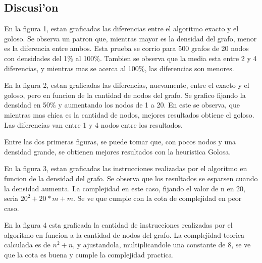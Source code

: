 \subsection{Discusi'on}

En la figura 1, estan graficadas las diferencias entre el algoritmo exacto y el goloso. Se observa un patron que, mientras mayor es la densidad del grafo, menor es la diferencia entre ambos. Esta prueba se corrio para 500 grafos de 20 nodos con densidades del 1\% al 100\%. Tambien se observa que la media esta entre 2 y 4 diferencias, y mientras mas se acerca al 100\%, las diferencias son menores.


En la figura 2, estan graficadas las diferencias, nuevamente, entre el exacto y el goloso, pero en funcion de la cantidad de nodos del grafo. Se grafico fijando la densidad en 50\% y aumentando los nodos de 1 a 20. En este se observa, que mientras mas chica es la cantidad de nodos, mejores resultados obtiene el goloso. Las diferencias van entre 1 y 4 nodos entre los resultados.


Entre las dos primeras figuras, se puede tomar que, con pocos nodos y una densidad grande, se obtienen mejores resultados con la heuristica Golosa.


En la figura 3, estan graficadas las instrucciones realizadas por el algoritmo en funcion de la densidad del grafo. Se observa que los resultados se esparsen cuando la densidad aumenta. La complejidad en este caso, fijando el valor de n en 20, seria $20^2+20*m+m$. Se ve que cumple con la cota de complejidad en peor caso.


En la figura 4 esta graficada la cantidad de instrucciones realizadas por el algoritmo en funcion a la cantidad de nodos del grafo. La complejidad teorica calculada es de $n^2+n$, y ajustandola, multiplicandole una constante de 8, se ve que la cota es buena y cumple la complejidad practica.
